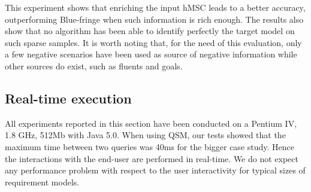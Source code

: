 This experiment shows that enriching the input hMSC leads to a better accuracy, outperforming Blue-fringe when such information is rich enough. The results also show that no algorithm has been able to identify perfectly the target model on such sparse samples. It is worth noting that, for the need of this evaluation, only a few negative scenarios have been used as source of negative information while other sources do exist, such as fluents and goals.


\subsection{Real-time execution}

All experiments reported in this section have been conducted on a Pentium IV, 1.8 GHz, 512Mb with Java 5.0. When using QSM, our tests showed that the maximum time between two queries was 40ms for the bigger case study. Hence the interactions with the end-user are performed in real-time. We do not expect any performance problem with respect to the user interactivity for typical sizes of requirement models.


